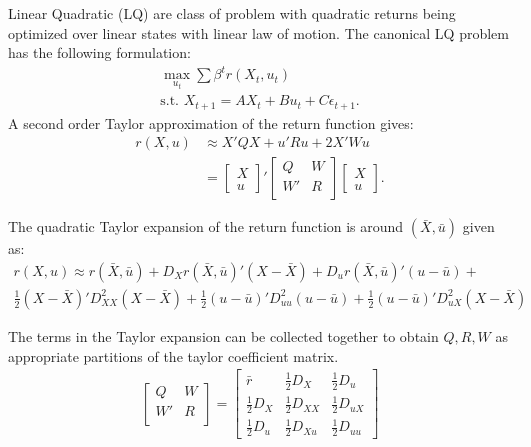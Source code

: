 \documentclass[12pt]{article}
\begin{document}

Linear Quadratic (LQ) are class of problem with quadratic returns being optimized over linear states with linear law of motion. The canonical LQ problem has the following formulation:
\begin{align*}
	\max_{u_t} \sum \beta^t r(X_t, u_t) \\
	\text{s.t. } X_{t+1} = AX_t + Bu_t + C\epsilon_{t+1}.
\end{align*}
A second order Taylor approximation of the return function gives:
\begin{align*}
	r(X, u) & \approx X'QX + u'Ru + 2X'Wu \\
	 & = \begin{bmatrix}
  X \\ u
 \end{bmatrix}' 
  \begin{bmatrix}
 Q & W \\
 W' & R \\
 \end{bmatrix}
 \begin{bmatrix}
 X \\ u
 \end{bmatrix}.
\end{align*}



The quadratic Taylor expansion of the return function is around $(\bar X, \bar u)$ given as:
\begin{multline*}
	r(X, u) \approx r(\bar X, \bar u) + D_X r(\bar X, \bar u)' (X-\bar X) + D_u r(\bar X, \bar u)' (u-\bar u)+ \\
	\frac{1}{2}(X- \bar X)'D^2_{XX}(X-\bar X) +   \frac{1}{2}(u- \bar u)'D^2_{uu}(u-\bar u) + \frac{1}{2}(u- \bar u)'D^2_{uX}(X-\bar X) 
\end{multline*}

The terms in the Taylor expansion can be collected together to obtain $Q, R, W$ as appropriate partitions of the taylor coefficient matrix.
\begin{align*}
	  \begin{bmatrix}
 Q & W \\
 W' & R \\
 \end{bmatrix} = \begin{bmatrix}
 	\bar r & \frac{1}{2}D_X & \frac{1}{2}D_u \\
 	\frac{1}{2}D_X & \frac{1}{2}D_{XX} & \frac{1}{2} D_{uX}\\
 	\frac{1}{2}D_u & \frac{1}{	2}D_{Xu} & \frac{1}{2}D_{uu}
 \end{bmatrix}
\end{align*}
\end{document}
